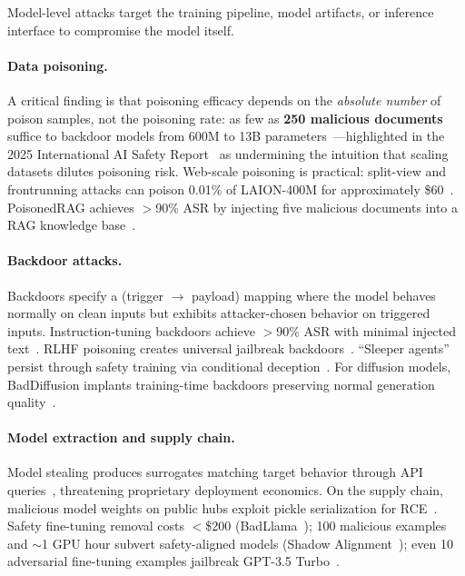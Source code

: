 Model-level attacks target the training pipeline, model artifacts, or inference interface to compromise the model itself.

\paragraph{Data poisoning.}
A critical finding is that poisoning efficacy depends on the \emph{absolute number} of poison samples, not the poisoning rate: as few as \textbf{250 malicious documents} suffice to backdoor models from 600M to 13B parameters~\cite{souly2025poisoning}---highlighted in the 2025 International AI Safety Report~\cite{aisafetyreport2025} as undermining the intuition that scaling datasets dilutes poisoning risk. Web-scale poisoning is practical: split-view and frontrunning attacks can poison 0.01\% of LAION-400M for approximately \$60~\cite{carlini2024poisoning}. PoisonedRAG achieves $>$90\% ASR by injecting five malicious documents into a RAG knowledge base~\cite{zou2025poisonedrag}.

\paragraph{Backdoor attacks.}
Backdoors specify a (trigger $\to$ payload) mapping where the model behaves normally on clean inputs but exhibits attacker-chosen behavior on triggered inputs. Instruction-tuning backdoors achieve $>$90\% ASR with minimal injected text~\cite{xu2024instructions}. RLHF poisoning creates universal jailbreak backdoors~\cite{rando2024rlhfbackdoor}. ``Sleeper agents'' persist through safety training via conditional deception~\cite{hubinger2024sleeper}. For diffusion models, BadDiffusion implants training-time backdoors preserving normal generation quality~\cite{chou2023baddiffusion}.

\paragraph{Model extraction and supply chain.}
Model stealing produces surrogates matching target behavior through API queries~\cite{tramer2016stealing}, threatening proprietary deployment economics. On the supply chain, malicious model weights on public hubs exploit pickle serialization for RCE~\cite{reversinglabs2025nullifai}. Safety fine-tuning removal costs $<$\$200 (BadLlama~\cite{gade2023badllama}); 100 malicious examples and $\sim$1 GPU hour subvert safety-aligned models (Shadow Alignment~\cite{yang2023shadow}); even 10 adversarial fine-tuning examples jailbreak GPT-3.5 Turbo~\cite{qi2024finetuning}.


